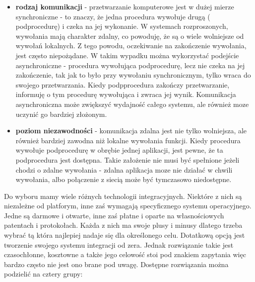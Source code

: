 \begin{itemize}
	\item \textbf{rodzaj komunikacji} - przetwarzanie komputerowe jest w dużej mierze synchroniczne - to znaczy, że jedna procedura wywołuje drugą ( podprocedurę) i czeka na jej wykonanie. W systemach rozproszonych, wywołania mają charakter zdalny, co powoduję, że są o wiele wolniejsze od wywołań lokalnych. Z tego powodu, oczekiwanie na zakończenie wywołania, jest często niepożądane. W takim wypadku można wykorzystać podejście asynchroniczne - procedura wywołująca podprocedurę, lecz nie czeka na jej zakończenie, tak jak to było przy wywołaniu synchronicznym, tylko wraca do swojego przetwarzania. Kiedy podpprocedura zakończy przetwarzanie, informuję o tym procedurę wywołująca i zwraca jej wynik. Komunikacja asynchroniczna może zwiększyć wydajność całego systemu, ale również moze uczynić go bardziej złożonym.
	\item \textbf{poziom niezawodności} - komunikacja zdalna jest nie tylko wolniejsza, ale również bardziej zawodna niż lokalne wywołania funkcji. Kiedy procedura wywołuje podprocedurę w obrębie jednej aplikacji, jest pewne, że ta podprocedura jest dostępna. Takie założenie nie musi być spełnione jeżeli chodzi o zdalne wywołania - zdalna aplikacja moze nie działać w chwili wywołania, albo połączenie z siecią może być tymczasowo niedostępne.
\end{itemize}

Do wyboru mamy wiele różnych technologii integracyjnych. Niektóre z nich są niezależne od platforym, inne zaś wymagają specyficznego systemu operacyjnego. Jedne są darmowe i otwarte, inne zaś płatne i oparte na własnościowych patentach i protokołach. Każda z nich ma swoje plusy i minusy dlatego trzeba wybrać tą która najlepiej nadaje się dla określonego celu. Dotatkową opcją jest tworzenie swojego systemu integracji od zera. Jednak rozwiązanie takie jest czasochłonne, kosztowne a także jego celowość stoi pod znakiem zapytania więc bardzo często nie jest ono brane pod uwagę.
Dostępne rozwiązania można podzielić na cztery grupy: \cite{chappell2004}

